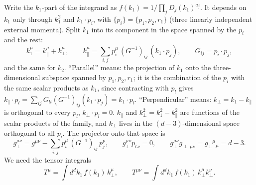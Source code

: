 \documentclass[11pt,a4paper]{article}
\newcommand{\kpar}{k_{\parallel}}
\newcommand{\kperp}{k_{\perp}}
\begin{document}
Write the $k_1$-part of the integrand as $f(k_1)=1/\prod_jD_j(k_1)^{a_j}$. It depends on $k_1$ only through $k_1^2$ and
$k_1\cdot p_i$, with $\{p_i\}=\{p_1,p_2,r_1\}$ (three linearly independent external momenta). Split $k_1$ into its
component in the space spanned by the $p_i$ and the rest:
\begin{equation}
k_1^\mu=\kpar^\mu+\kperp^\mu,\qquad
\kpar^\mu=\sum_{i,j}p_i^\mu\,(G^{-1})_{ij}\,(k_1\cdot p_j),\qquad G_{ij}=p_i\cdot p_j ,
\end{equation}
and the same for $k_2$. ``Parallel'' means: the projection of $k_1$ onto the three-dimensional subspace spanned by
$p_1,p_2,r_1$; it is the combination of the $p_i$ with the same scalar products as $k_1$, since contracting with
$p_l$ gives $\kpar\cdot p_l=\sum_{ij}G_{li}(G^{-1})_{ij}(k_1\cdot p_j)=k_1\cdot p_l$. ``Perpendicular'' means:
$\kperp=k_1-\kpar$ is orthogonal to every $p_l$, $\kperp\cdot p_l=0$.
$\kpar$ and $\kperp^2=k_1^2-\kpar^2$ are functions of the scalar products of the family,
and $\kperp$ lives in the $(d-3)$-dimensional space orthogonal to all $p_i$. The projector onto that space is
\begin{equation}
g_\perp^{\mu\nu}=g^{\mu\nu}-\sum_{i,j}p_i^\mu\,(G^{-1})_{ij}\,p_j^\nu ,\qquad
g_\perp^{\mu\nu}p_{l\,\nu}=0,\qquad g_\perp^{\mu\nu}g_{\perp\,\mu\nu}=g_\perp{}^\mu{}_\mu=d-3 .
\end{equation}
We need the tensor integrals
\begin{equation}
T^\mu=\int\!d^dk_1\,f(k_1)\,\kperp^\mu ,\qquad T^{\mu\nu}=\int\!d^dk_1\,f(k_1)\,\kperp^\mu\kperp^\nu .
\end{equation}
\end{document}
